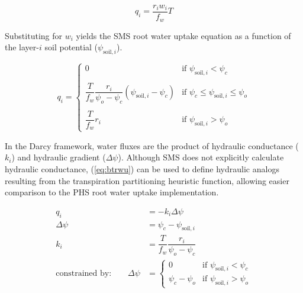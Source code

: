 \documentclass[draft,linenumbers]{agujournal}
\begin{document}
    \begin{linenomath*}
    \begin{equation}
    \label{bt:4}
    q_i = \dfrac{r_i w_i}{f_w}T
    \end{equation}
    \end{linenomath*}
    
    Substituting for $w_i$ yields the SMS root water uptake equation as a function of the layer-$i$ soil potential ($\psi_{\text{soil},i}$).
    
    \begin{linenomath*}
    \begin{equation}
    q_i =
    \begin{cases}
    \label{eq:btrwu}
    0    & \text{if } \psi_{\text{soil},i}<\psi_{c}  \\
    \\[1pt]
        \dfrac{T}{f_w} \dfrac{r_i}{\psi_{o}-\psi_{c}} \left(\psi_{\text{soil},i}-\psi_{c} \right)     & \text{if } \psi_{c} \le \psi_{\text{soil},i} \le \psi_{o} \\
    \\[1pt]
    \dfrac{T}{f_w} r_i    & \text{if } \psi_{\text{soil},i} > \psi_{o}
    \end{cases}
    \end{equation}
    \end{linenomath*}
    
    In the Darcy framework, water fluxes are the product of hydraulic conductance ($k_i$) and hydraulic gradient ($\Delta\psi$).
    Although SMS does not explicitly calculate hydraulic conductance, (\ref{eq:btrwu}) can be used to define hydraulic analogs resulting from the transpiration partitioning heuristic function, 
    allowing easier comparison to the PHS root water uptake implementation.
    
    \begin{linenomath*}
    \begin{equation} \begin{aligned}
    q_i &= -k_i\Delta\psi \\
    \Delta\psi &=  \psi_{c}-\psi_{\text{soil},i} \\
    k_i &= \dfrac{T}{f_w} \dfrac{r_i}{\psi_{o}-\psi_{c}} \\
    \mbox{constrained by:} \qquad
    \Delta\psi &=
    \begin{cases}
    0                          & \text{if } \psi_{\text{soil},i}<\psi_{c}  \\
    \psi_{c}-\psi_{o} & \text{if } \psi_{\text{soil},i}>\psi_{o}
    \label{kb}
    \end{cases}
    \end{aligned}\end{equation}
    \end{linenomath*}
    
\end{document}
